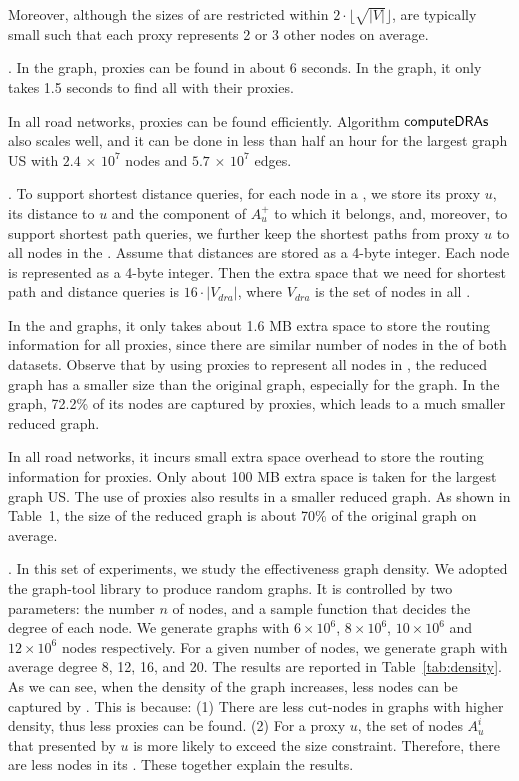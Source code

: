  Moreover, although the sizes of \dras are restricted within $2\cdot\lfloor\sqrt{|V|}\rfloor$, \dras are typically small such that each proxy represents 2 or 3 other nodes on average.







.
In the \dblp graph, proxies can be found in about 6 seconds. In the \dblpone graph, it only takes 1.5 seconds to find all \dras with their proxies.

In all road networks, proxies can be found efficiently. Algorithm ${\mathsf{computeDRAs}}$ also scales well, and it can be done in less than half an hour for the largest graph US with $2.4$ $\times$ $10^7$ nodes and $5.7$ $\times$ $10^7$ edges.

.
To support shortest distance queries, for each node in a \dra, we store its proxy $u$, its distance to $u$ and the component of $A^{+}_u$ to which it belongs, and, moreover, to support shortest path queries, we further keep the shortest paths from proxy $u$ to all nodes in the \dra. Assume that distances are stored as a 4-byte integer. Each node is represented as a 4-byte integer. Then the extra space that we need for shortest path and distance queries is $16\cdot |V_{dra}|$, where $V_{dra}$ is the set of nodes in all \dras.

In the \dblp and \dblpone graphs, it only takes about 1.6 MB extra space to store the routing information for all proxies, since there are similar number of nodes in the \dras of both datasets. Observe that by using proxies to represent all nodes in \dras, the reduced graph  has a smaller size than the original graph, especially for the \dblpone graph. In the \dblpone graph, 72.2\% of its nodes are captured by proxies, which leads to a much smaller reduced graph.

In all road networks, it incurs small extra space overhead to store the routing information for proxies. Only about 100 MB extra space is taken for the largest graph US. The use of proxies also results in a smaller reduced graph. As shown in Table~1, the size of the reduced graph is about 70\% of the original graph on average.


.
In this set of experiments, we study the effectiveness \wrt graph density. We adopted the graph-tool library to produce random graphs. It is controlled by two parameters: the number $n$ of nodes, and a sample function that decides the degree of each node. We generate graphs with $6\times 10^{6}$, $8\times 10^{6}$, $10\times 10^{6}$ and $12\times 10^{6}$ nodes respectively. For a given number of nodes, we generate graph with average degree 8, 12, 16, and 20. The results are reported in Table~\ref{tab:density}. As we can see, when the density of the graph increases, less nodes can be captured by \dras. This is because: (1) There are less cut-nodes in graphs with higher density, thus less proxies can be found. (2) For a proxy $u$, the set of nodes $A_u^i$ that presented by $u$ is more likely to exceed the size constraint. Therefore, there are less nodes in its \dra. These together explain the results.

